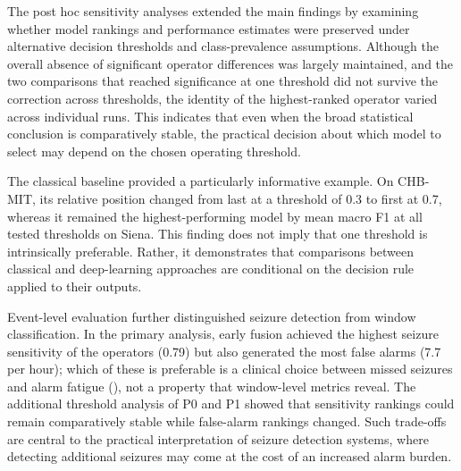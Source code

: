 \documentclass[11pt,a4paper]{article}
\begin{document}
The post hoc sensitivity analyses extended the main findings by examining whether model
rankings and performance estimates were preserved under alternative decision thresholds
and class-prevalence assumptions. Although the overall absence of significant operator
differences was largely maintained, and the two comparisons that reached significance at
one threshold did not survive the correction across thresholds, the identity of the
highest-ranked operator varied across individual runs. This indicates that even when the
broad statistical conclusion is comparatively stable, the practical decision about which
model to select may depend on the chosen operating threshold.

The classical baseline provided a particularly informative example. On CHB-MIT, its
relative position changed from last at a threshold of 0.3 to first at 0.7, whereas it
remained the highest-performing model by mean macro F1 at all tested thresholds on
Siena. This finding does not imply that one threshold is intrinsically preferable.
Rather, it demonstrates that comparisons between classical and deep-learning approaches
are conditional on the decision rule applied to their outputs.

Event-level evaluation further distinguished seizure detection from window
classification. In the primary analysis, early fusion achieved the highest seizure
sensitivity of the operators (0.79) but also generated the most false alarms (7.7 per
hour); which of these is preferable is a clinical choice between missed seizures and
alarm fatigue (\citealp{Sendelbach_2013}), not a property that window-level metrics
reveal. The additional threshold analysis of P0 and P1 showed that sensitivity rankings
could remain comparatively stable while false-alarm rankings changed. Such trade-offs are
central to the practical interpretation of seizure detection systems, where detecting
additional seizures may come at the cost of an increased alarm burden.
\end{document}
